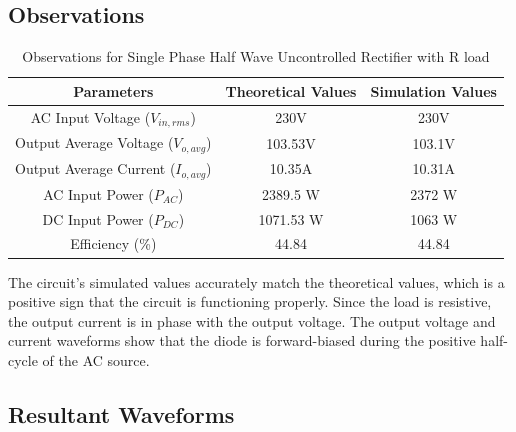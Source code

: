 \subsection{Observations}

\begin{table}[h]
    \renewcommand{\arraystretch}{1.3}
    \label{table_observation_circuit_1}
    \centering
    \begin{tabular}{|c|c|c|}
        \hline
        Parameters                              & Theoretical Values & Simulation Values \\
        \hline
        \hline
        AC Input Voltage ($ V_{in,rms} $)       & 230V               & 230V              \\
        \hline
        Output Average Voltage ($ V_{o,avg} $)  & 103.53V            & 103.1V            \\
        \hline
        Output Average Current ($ I_{o,avg}  $) & 10.35A             & 10.31A            \\
        \hline
        AC Input Power ($ P_{AC}  $)            & 2389.5 W           & 2372 W            \\
        \hline
        DC Input Power ($ P_{DC}  $)            & 1071.53 W          & 1063 W            \\
        \hline
        Efficiency (\%)                         & 44.84              & 44.84             \\
        \hline
    \end{tabular}
    \caption{Observations for Single Phase Half Wave Uncontrolled Rectifier with R load}

\end{table}


The circuit's simulated values accurately match the theoretical values, which is a positive sign that the circuit is functioning properly. Since the load is resistive, the output current is in phase with the output voltage. The output voltage and current waveforms show that the diode is forward-biased during the positive half-cycle of the AC source.

\pagebreak

\subsection{Resultant Waveforms}

